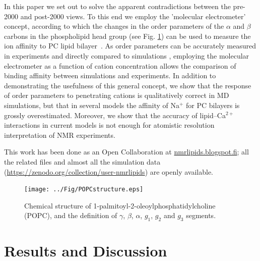 \documentclass[twoside,twocolumn,9pt]{article}
\begin{document}
In this paper we set out to solve the apparent contradictions
between the pre-2000 and post-2000 views.
To this end we employ the 'molecular electrometer' concept,
according to which the changes in the order parameters of the $\alpha$ and $\beta$ carbons 
in the phospholipid head group (see Fig. \ref{POPCstructure}) can be used to measure the ion affinity to 
PC lipid bilayer~\cite{brown77,akutsu81,altenbach84,seelig87,scherer89}.
As order parameters can be accurately measured in experiments and directly compared to 
simulations \cite{ollila16}, employing the molecular electrometer as a function of cation concentration allows the 
comparison of binding affinity between simulations and experiments.
In addition to demonstrating the usefulness of this general concept,
we show that the response of order parameters to penetrating cations
is qualitatively correct in MD simulations, but that in several  models the affinity of Na$^{+}$ for PC bilayers
is grossly overestimated.
Moreover, we show that the accuracy of lipid--Ca$^{2+}$ interactions 
in current models is not enough for atomistic resolution interpretation of NMR experiments. 

This work has been done as an Open Collaboration at \url{nmrlipids.blogspot.fi};
all the related files \cite{githubIONpaper} %
and almost all the simulation data (\url{https://zenodo.org/collection/user-nmrlipids})
are openly available.

\begin{figure}[]
  \centering
  \texttt{[image: ../Fig/POPCstructure.eps]}

  \caption{\label{POPCstructure}
    Chemical structure of 1-palmitoyl-2-oleoylphosphatidylcholine (POPC), and the definition of $\gamma$, $\beta$, $\alpha$, $g_1$, $g_2$ and $g_3$ segments.}
  
\end{figure}


\section{Results and Discussion}
\end{document}
